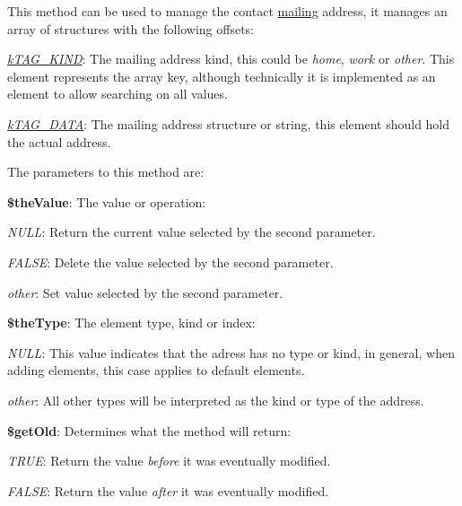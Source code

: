 This method can be used to manage the contact \hyperlink{}{mailing} address, it manages an array of structures with the following offsets\-:


\begin{DoxyItemize}
\item {\itshape \hyperlink{}{k\-T\-A\-G\-\_\-\-K\-I\-N\-D}}\-: The mailing address kind, this could be {\itshape home}, {\itshape work} or {\itshape other}. This element represents the array key, although technically it is implemented as an element to allow searching on all values. 
\item {\itshape \hyperlink{}{k\-T\-A\-G\-\_\-\-D\-A\-T\-A}}\-: The mailing address structure or string, this element should hold the actual address. 
\end{DoxyItemize}

The parameters to this method are\-:


\begin{DoxyItemize}
\item {\bfseries \$the\-Value}\-: The value or operation\-: 
\begin{DoxyItemize}
\item {\itshape N\-U\-L\-L}\-: Return the current value selected by the second parameter. 
\item {\itshape F\-A\-L\-S\-E}\-: Delete the value selected by the second parameter. 
\item {\itshape other}\-: Set value selected by the second parameter. 
\end{DoxyItemize}
\item {\bfseries \$the\-Type}\-: The element type, kind or index\-: 
\begin{DoxyItemize}
\item {\itshape N\-U\-L\-L}\-: This value indicates that the adress has no type or kind, in general, when adding elements, this case applies to default elements. 
\item {\itshape other}\-: All other types will be interpreted as the kind or type of the address. 
\end{DoxyItemize}
\item {\bfseries \$get\-Old}\-: Determines what the method will return\-: 
\begin{DoxyItemize}
\item {\itshape T\-R\-U\-E}\-: Return the value {\itshape before} it was eventually modified. 
\item {\itshape F\-A\-L\-S\-E}\-: Return the value {\itshape after} it was eventually modified. 
\end{DoxyItemize}
\end{DoxyItemize}


